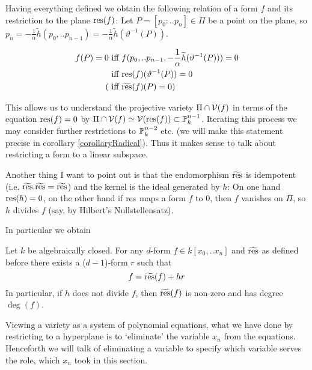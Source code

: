 Having everything defined we obtain the following relation of a form $f$ and its restriction to the plane ${\operatorname{res}}(f)$: Let $P = [p_0:..p_n] \in \Pi$ be a point on the plane, so $p_n = -\frac 1\alpha \widetilde h(p_0,..p_{n-1}) = -\frac 1\alpha \widetilde h(\vartheta^{-1}(P))$.

\begin{align}
f(P) = 0
&\text{ iff } f(p_0,..p_{n-1},-\frac 1\alpha \widetilde h(\vartheta^{-1}(P))) = 0
\\
&\text { iff } {\operatorname{res}}(f)(\vartheta^{-1}(P)) = 0
\\
(&\text{ iff } \widetilde{{\operatorname{res}}}(f)(P) = 0)
\end{align}

This allows us to understand the projective variety $\Pi \cap \operatorname{\mathcal V}(f)$ in terms of the equation ${\operatorname{res}}(f) = 0$ by $\Pi \cap \operatorname{\mathcal V}(f) \simeq \operatorname{\mathcal V}({\operatorname{res}}(f)) \subset \operatorname{\mathbb P}^{n-1}_k$.
Iterating this process we may consider further restrictions to $\operatorname{\mathbb P}^{n-2}_k$ etc. (we will make this statement precise in corollary \ref{corollaryRadical}).
Thus it makes sense to talk about restricting a form to a linear subspace.

Another thing I want to point out is that the endomorphism $\widetilde{{\operatorname{res}}}$ is idempotent (i.e. $\widetilde{{\operatorname{res}}}.\widetilde{{\operatorname{res}}} = \widetilde{{\operatorname{res}}}$) and the kernel is the ideal generated by $h$: On one hand ${\operatorname{res}}(h) = 0$, on the other hand if ${\operatorname{res}}$ maps a form $f$ to $0$, then $f$ vanishes on $\Pi$, so $h$ divides $f$ (say, by Hilbert's Nullstellensatz).

In particular we obtain
\begin{proposition} \label{propositionRestriction}
Let $k$ be algebraically closed.
For any $d$-form $f \in k[x_0,..x_n]$ and $\widetilde{{\operatorname{res}}}$ as defined before there exists a ($d-1$)-form $r$ such that
\begin{equation}
f = \widetilde{{\operatorname{res}}}(f) +  hr
\end{equation}
In particular, if $h$ does not divide $f$, then $\widetilde{{\operatorname{res}}}(f)$ is non-zero and has degree $\deg(f)$.
\end{proposition}

\begin{remark}
Viewing a variety as a system of polynomial equations, what we have done by restricting to a hyperplane is to `eliminate' the variable $x_n$ from the equations.
Henceforth we will talk of eliminating a variable to specify which variable serves the role, which $x_n$ took in this section.
\end{remark}

